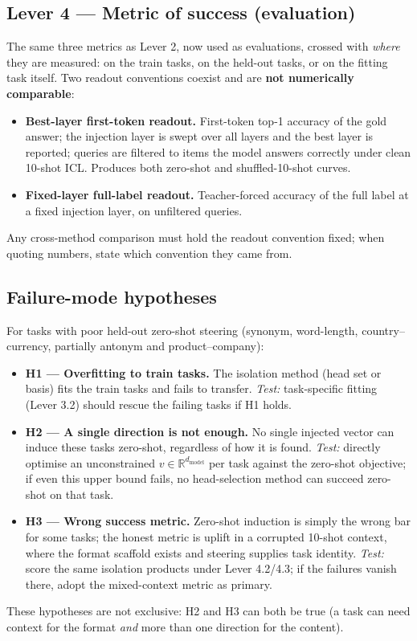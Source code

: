 \documentclass[
]{article}
\providecommand{\tightlist}{%
  \setlength{\itemsep}{0pt}\setlength{\parskip}{0pt}}
\newcommand{\dmodel}{d_{\mathrm{model}}}
\begin{document}
\subsection{Lever 4 — Metric of success (evaluation)}\label{lever-4-metric-of-success}

The same three metrics as Lever 2, now used as evaluations, crossed with \emph{where}
they are measured: on the train tasks, on the held-out tasks, or on the fitting task
itself. Two readout conventions coexist and are \textbf{not numerically comparable}:

\begin{itemize}
\tightlist
\item
  \textbf{Best-layer first-token readout.} First-token top-1 accuracy of the gold
  answer; the injection layer is swept over all layers and the best layer is
  reported; queries are filtered to items the model answers correctly under clean
  10-shot ICL. Produces both zero-shot and shuffled-10-shot curves.
\item
  \textbf{Fixed-layer full-label readout.} Teacher-forced accuracy of the full label
  at a fixed injection layer, on unfiltered queries.
\end{itemize}

Any cross-method comparison must hold the readout convention fixed; when quoting
numbers, state which convention they came from.

\subsection{Failure-mode hypotheses}\label{failure-mode-hypotheses}

For tasks with poor held-out zero-shot steering (synonym, word-length,
country--currency, partially antonym and product--company):

\begin{itemize}
\tightlist
\item
  \textbf{H1 — Overfitting to train tasks.} The isolation method (head set or basis)
  fits the train tasks and fails to transfer. \emph{Test:} task-specific fitting
  (Lever 3.2) should rescue the failing tasks if H1 holds.
\item
  \textbf{H2 — A single direction is not enough.} No single injected vector can
  induce these tasks zero-shot, regardless of how it is found. \emph{Test:} directly
  optimise an unconstrained \(v \in \mathbb{R}^{\dmodel}\) per task against the
  zero-shot objective; if even this upper bound fails, no head-selection method can
  succeed zero-shot on that task.
\item
  \textbf{H3 — Wrong success metric.} Zero-shot induction is simply the wrong bar
  for some tasks; the honest metric is uplift in a corrupted 10-shot context, where
  the format scaffold exists and steering supplies task identity. \emph{Test:} score
  the same isolation products under Lever 4.2/4.3; if the failures vanish there,
  adopt the mixed-context metric as primary.
\end{itemize}

These hypotheses are not exclusive: H2 and H3 can both be true (a task can need
context for the format \emph{and} more than one direction for the content).
\end{document}
